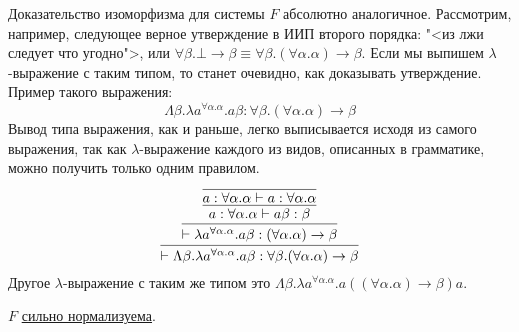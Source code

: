 Доказательство изоморфизма для системы $F$ абсолютно аналогичное.
Рассмотрим, например, следующее верное утверждение в ИИП второго порядка: "<из лжи следует что угодно">, или
$\forall \beta . \bot \to \beta \equiv \forall \beta . (\forall \alpha.\alpha) \to \beta$.
Если мы выпишем $\lambda$-выражение с таким типом, то станет очевидно, как доказывать утверждение. Пример такого выражения:
\[
    \Lambda \beta . \lambda a^{\forall \alpha.\alpha} . a \beta :
    \forall \beta . (\forall \alpha.\alpha) \to \beta
\]
Вывод типа выражения, как и раньше, легко выписывается исходя из самого выражения,
так как $\lambda$-выражение каждого из видов, описанных в грамматике, можно получить только одним правилом.
\[
    \infer{\vdash \Lambda \beta . \lambda a^{\forall \alpha.\alpha} . a \beta : \forall \beta . (\forall \alpha.\alpha) \to \beta}
    {   \infer{\vdash \lambda a^{\forall \alpha.\alpha} . a \beta : (\forall \alpha.\alpha) \to \beta}
        {   \infer{a : \forall \alpha . \alpha \vdash a \beta : \beta}
            {   \infer{a : \forall \alpha.\alpha \vdash a : \forall \alpha.\alpha}{}
            }
        }
    }
\]
Другое $\lambda$-выражение с таким же типом это
$\Lambda \beta . \lambda a^{\forall \alpha . \alpha} . a ((\forall \alpha.\alpha) \to \beta) a$.

\begin{theorem}
    $F$ \hyperref[strong-normalization]{сильно нормализуема}.
\end{theorem}
